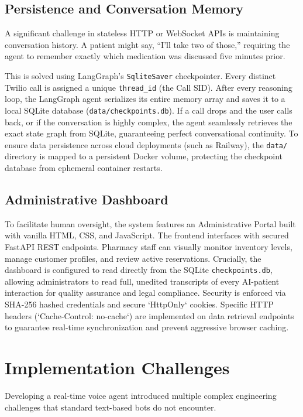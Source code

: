 \documentclass[conference,a4paper]{IEEEtran}
\begin{document}
\subsection{Persistence and Conversation Memory}
A significant challenge in stateless HTTP or WebSocket APIs is maintaining conversation history. A patient might say, ``I'll take two of those,'' requiring the agent to remember exactly which medication was discussed five minutes prior. 

This is solved using LangGraph's \texttt{SqliteSaver} checkpointer. Every distinct Twilio call is assigned a unique \texttt{thread\_id} (the Call SID). After every reasoning loop, the LangGraph agent serializes its entire memory array and saves it to a local SQLite database (\texttt{data/checkpoints.db}). If a call drops and the user calls back, or if the conversation is highly complex, the agent seamlessly retrieves the exact state graph from SQLite, guaranteeing perfect conversational continuity. To ensure data persistence across cloud deployments (such as Railway), the \texttt{data/} directory is mapped to a persistent Docker volume, protecting the checkpoint database from ephemeral container restarts.

\subsection{Administrative Dashboard}
To facilitate human oversight, the system features an Administrative Portal built with vanilla HTML, CSS, and JavaScript. The frontend interfaces with secured FastAPI REST endpoints. Pharmacy staff can visually monitor inventory levels, manage customer profiles, and review active reservations. Crucially, the dashboard is configured to read directly from the SQLite \texttt{checkpoints.db}, allowing administrators to read full, unedited transcripts of every AI-patient interaction for quality assurance and legal compliance. Security is enforced via SHA-256 hashed credentials and secure `HttpOnly` cookies. Specific HTTP headers (`Cache-Control: no-cache`) are implemented on data retrieval endpoints to guarantee real-time synchronization and prevent aggressive browser caching.

\section{Implementation Challenges}

Developing a real-time voice agent introduced multiple complex engineering challenges that standard text-based bots do not encounter.
\end{document}

